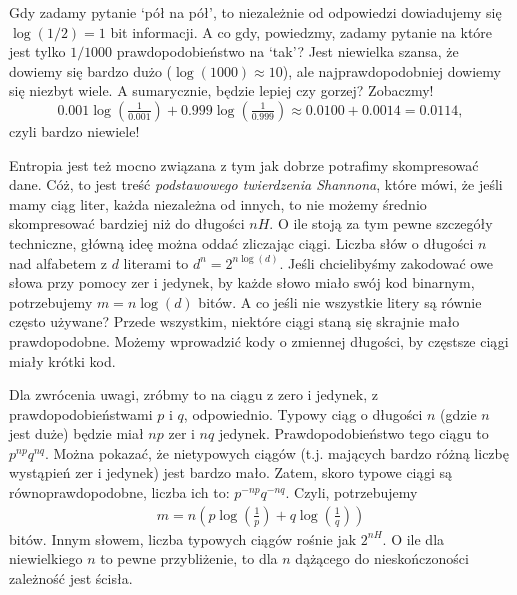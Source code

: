 \documentclass[10pt,a4paper]{article}
\begin{document}
Gdy zadamy pytanie `pół na pół', to niezależnie od odpowiedzi dowiadujemy się $\log(1/2)=1$ bit informacji.
A co gdy, powiedzmy, zadamy pytanie na które jest tylko $1/1000$ prawdopodobieństwo na `tak'?
Jest niewielka szansa, że dowiemy się bardzo dużo ($\log(1000)\approx 10$), ale najprawdopodobniej dowiemy się niezbyt wiele.
A sumarycznie, będzie lepiej czy gorzej? Zobaczmy!
%
\begin{equation}
    0.001 \log(\tfrac{1}{0.001}) + 0.999 \log(\tfrac{1}{0.999})\approx 0.0100 + 0.0014 = 0.0114,
\end{equation}
%
czyli bardzo niewiele!


Entropia jest też mocno związana z tym jak dobrze potrafimy skompresować dane.
Cóż, to jest treść \emph{podstawowego twierdzenia Shannona}, które mówi, że jeśli mamy ciąg liter,
każda niezależna od innych, to nie możemy średnio skompresować bardziej niż do długości $n H$.
O ile stoją za tym pewne szczegóły techniczne, główną ideę można oddać zliczając ciągi.
Liczba słów o długości $n$ nad alfabetem z $d$ literami to $d^n=2^{n \log(d)}$.
Jeśli chcielibyśmy zakodować owe słowa przy pomocy zer i jedynek,
by każde słowo miało swój kod binarnym, potrzebujemy $m = n \log(d)$ bitów.
A co jeśli nie wszystkie litery są równie często używane?
Przede wszystkim, niektóre ciągi staną się skrajnie mało prawdopodobne.
Możemy wprowadzić kody o zmiennej długości, by częstsze ciągi miały krótki kod.

Dla zwrócenia uwagi, zróbmy to na ciągu z zero i jedynek, z prawdopodobieństwami $p$ i $q$, odpowiednio.
Typowy ciąg o długości $n$ (gdzie $n$ jest duże) będzie miał $n p$ zer i $n q$ jedynek.
Prawdopodobieństwo tego ciągu to $p^{n p}q^{n q}$.
Można pokazać, że nietypowych ciągów (t.j. mających bardzo różną liczbę wystąpień zer i jedynek) jest bardzo mało.
Zatem, skoro typowe ciągi są równoprawdopodobne, liczba ich to:
$p^{-n p}q^{-n q}$.
Czyli, potrzebujemy
%
\begin{align}
    m=n \left( p \log(\tfrac{1}{p}) + q \log(\tfrac{1}{q}) \right)
\end{align}
%
bitów.
Innym słowem, liczba typowych ciągów rośnie jak $2^{n H}$.
O ile dla niewielkiego $n$ to pewne przybliżenie, to dla $n$ dążącego do nieskończoności zależność jest ścisła.

\end{document}
